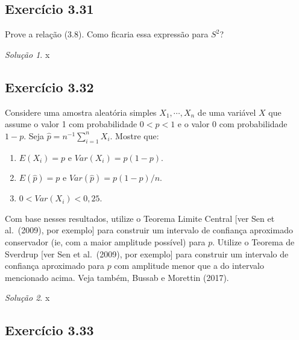 \documentclass[
]{latex/krantz}
\providecommand{\tightlist}{%
  \setlength{\itemsep}{0pt}\setlength{\parskip}{0pt}}
\theoremstyle{definition}
\theoremstyle{definition}
\theoremstyle{definition}
\theoremstyle{definition}
\theoremstyle{remark}
\newtheorem*{solution}{Solução}
\begin{document}
\hypertarget{exr3-31}{%
\subsection*{Exercício 3.31}\label{exr3-31}}

Prove a relação (3.8). Como ficaria essa expressão para \(S^{2}\)?

\begin{solution}
x
\end{solution}

\hypertarget{exr3-32}{%
\subsection*{Exercício 3.32}\label{exr3-32}}

Considere uma amostra aleatória simples \(X_{1}, \cdots , X_{n}\) de uma variável \(X\) que assume o valor 1 com probabilidade \(0 < p < 1\) e o valor 0 com probabilidade \(1 - p\). Seja \(\hat{p} = n^{-1} \sum_{i=1}^{n} X_{i}\). Mostre que:

\begin{enumerate}
\def\labelenumi{\roman{enumi})}
\tightlist
\item
  \(E(X_{i}) = p\) e \(Var(X_{i}) = p (1 - p)\).
\item
  \(E(\hat{p}) = p\) e \(Var(\hat{p}) = p (1 - p) / n\).
\item
  \(0 < Var(X_{i}) < 0,25\).
\end{enumerate}

Com base nesses resultados, utilize o Teorema Limite Central {[}ver Sen et al.~(2009), por exemplo{]} para construir um intervalo de confiança aproximado conservador (ie, com a maior amplitude possível) para \(p\). Utilize o Teorema de Sverdrup {[}ver Sen et al.~(2009), por exemplo{]} para construir um intervalo de confiança aproximado para \(p\) com amplitude menor que a do intervalo mencionado acima. Veja também, Bussab e Morettin (2017).

\begin{solution}
x
\end{solution}

\hypertarget{exr3-33}{%
\subsection*{Exercício 3.33}\label{exr3-33}}
\end{document}
